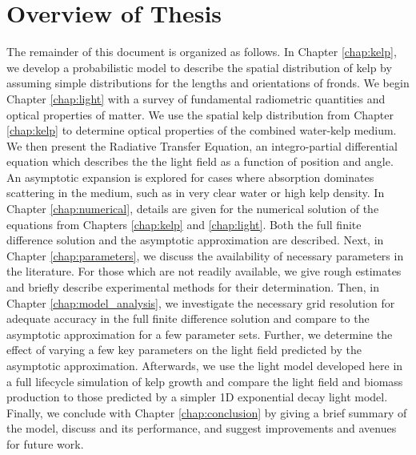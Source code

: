 \section{Overview of Thesis}
The remainder of this document is organized as follows.
In Chapter \ref{chap:kelp}, we develop a probabilistic model to describe the spatial distribution of kelp by assuming simple distributions for the lengths and orientations of fronds.
We begin Chapter \ref{chap:light} with a survey of fundamental radiometric quantities and optical properties of matter.
We use the spatial kelp distribution from Chapter \ref{chap:kelp} to determine optical properties of the combined water-kelp medium.
We then present the Radiative Transfer Equation, an integro-partial differential equation which describes the the light field as a function of position and angle.
An asymptotic expansion is explored for cases where absorption dominates scattering in the medium, such as in very clear water or high kelp density.
In Chapter \ref{chap:numerical}, details are given for the numerical solution of the equations from Chapters \ref{chap:kelp} and \ref{chap:light}.
Both the full finite difference solution and the asymptotic approximation are described.
Next, in Chapter \ref{chap:parameters}, we discuss the availability of necessary parameters in the literature.
For those which are not readily available, we give rough estimates and briefly describe experimental methods for their determination.
Then, in Chapter \ref{chap:model_analysis}, we investigate the necessary grid resolution for adequate accuracy in the full finite difference solution and compare to the asymptotic approximation for a few parameter sets.
Further, we determine the effect of varying a few key parameters on the light field predicted by the asymptotic approximation.
Afterwards, we use the light model developed here in a full lifecycle simulation of kelp growth and compare the light field and biomass production to those predicted by a simpler 1D exponential decay light model.
Finally, we conclude with Chapter \ref{chap:conclusion} by giving a brief summary of the model, discuss and its performance, and suggest improvements and avenues for future work.
